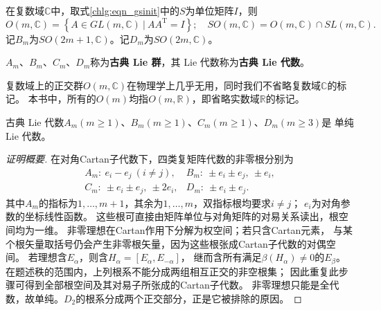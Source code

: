 在复数域$\mathbb{C}$中，取式\eqref{chlg:eqn_gsinit}中的$S$为单位矩阵$I$，则
\begin{equation*}
	O(m,\mathbb{C}) = \left\{ A \in GL(m,\mathbb{C})\ |\ A A^{\mathrm{T}} =I \right\};
	\quad SO(m,\mathbb{C}) = O(m,\mathbb{C}) \cap SL(m,\mathbb{C}).
\end{equation*}
记$B_m$为$SO(2m+1,\mathbb{C})$。记$D_m$为$SO(2m,\mathbb{C})$。

$A_m$、$B_m$、$C_m$、$D_m$称为\textbf{古典 Lie 群}，其 Lie 代数称为\textbf{古典 Lie 代数}。

复数域上的正交群$O(m,\mathbb{C})$在物理学上几乎无用，同时我们不省略复数域$\mathbb{C}$的标记。
本书中，所有的$O(m)$均指$O(m,\mathbb{R})$，即省略实数域$\mathbb{R}$的标记。

\begin{theorem}
	古典 Lie 代数$A_m(m\geqslant 1)$、$B_m(m\geqslant 1)$、$C_m(m\geqslant 1)$、$D_m(m\geqslant 3)$是
	单纯 Lie 代数。
\end{theorem}
\begin{proof}[证明概要]
在对角Cartan子代数下，四类复矩阵代数的非零根分别为
\[
 \begin{array}{ll}
 A_m:\ e_i-e_j\ (i\ne j), & B_m:\ \pm e_i\pm e_j,\ \pm e_i,\\
 C_m:\ \pm e_i\pm e_j,\ \pm2e_i, & D_m:\ \pm e_i\pm e_j .
 \end{array}
\]
其中$A_m$的指标为$1,\ldots,m+1$，其余为$1,\ldots,m$，双指标根均要求$i\ne j$；
$e_i$为对角参数的坐标线性函数。
这些根可直接由矩阵单位与对角矩阵的对易关系读出，根空间均为一维。
非零理想在Cartan作用下分解为权空间；若只含Cartan元素，
与某个根矢量取括号仍会产生非零根矢量，因为这些根张成Cartan子代数的对偶空间。
若理想含$E_\alpha$，则含$H_\alpha=[E_\alpha,E_{-\alpha}]$，
继而含所有满足$\beta(H_\alpha)\ne0$的$E_\beta$。
在题述秩的范围内，上列根系不能分成两组相互正交的非空根集；
因此重复此步骤可得到全部根空间及其对易子所张成的Cartan子代数。
非零理想只能是全代数，故单纯。$D_2$的根系分成两个正交部分，正是它被排除的原因。
\end{proof}

